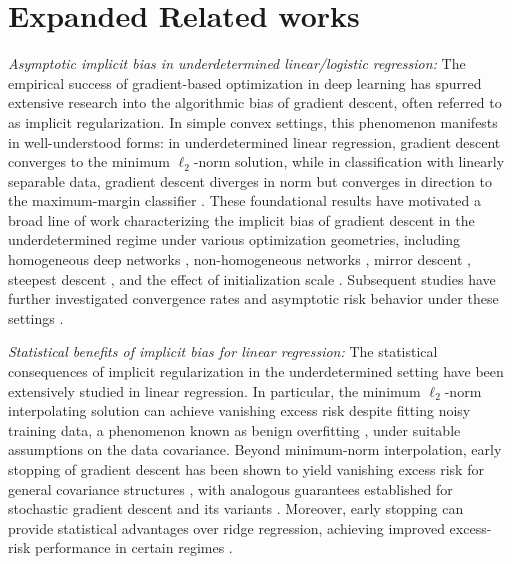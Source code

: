 \documentclass{article}
\theoremstyle{plain}
\theoremstyle{definition}
\theoremstyle{remark}
\begin{document}
{%







\section{Expanded Related works}
\label{related-works-extended}
\textit{Asymptotic implicit bias in underdetermined linear/logistic regression:} The empirical success of gradient-based optimization in deep learning has spurred extensive research into the algorithmic bias of gradient descent, often referred to as implicit regularization. In simple convex settings, this phenomenon manifests in well-understood forms: in underdetermined linear regression, gradient descent converges to the minimum $\ell_{2}$-norm solution, while in classification with linearly separable data, gradient descent diverges in norm but converges in direction to the maximum-margin classifier \cite{soudry2018implicit, ji2019implicit}. These foundational results have motivated a broad line of work characterizing the implicit bias of gradient descent in the underdetermined regime under various optimization geometries, including homogeneous deep networks \cite{gunasekar2018characterizing, lyu2019gradient, ji2018gradient}, non-homogeneous networks \cite{cai2025implicit}, mirror descent \cite{sun2023unified}, steepest descent \cite{tsilivis2024flavors}, and the effect of initialization scale \cite{moroshko2020implicit}. Subsequent studies have further investigated convergence rates and asymptotic risk behavior under these settings \cite{nacson2019convergence, ji2018risk, ji2021characterizing}.

\textit{Statistical benefits of implicit bias for linear regression:} The statistical consequences of implicit regularization in the underdetermined setting have been extensively studied in linear regression. In particular, the minimum $\ell_{2}$-norm interpolating solution can achieve vanishing excess risk despite fitting noisy training data, a phenomenon known as benign overfitting \cite{bartlett2020benign, tsigler2023benign}, under suitable assumptions on the data covariance. Beyond minimum-norm interpolation, early stopping of gradient descent has been shown to yield vanishing excess risk for general covariance structures \cite{buhlmann2003boosting, yao2007early}, with analogous guarantees established for stochastic gradient descent and its variants \cite{li2023risk, wu2022last, zou2021benefits}. Moreover, early stopping can provide statistical advantages over ridge regression, achieving improved excess-risk performance in certain regimes \cite{wu2025risk, ali2019continuous}.

}
\end{document}
